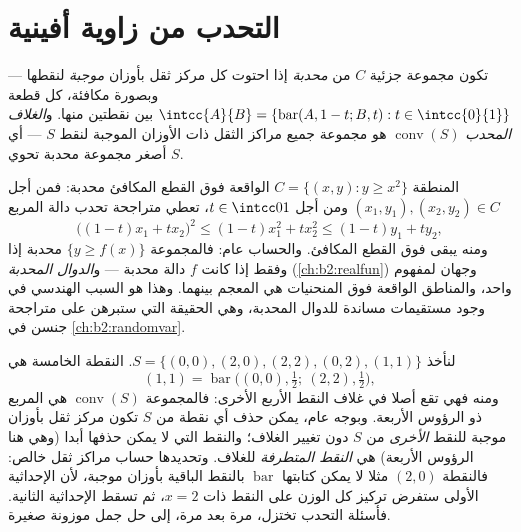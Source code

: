 \section{التحدب من زاوية أفينية}

\begin{definition}\label{def:b2:affine:convex}
تكون مجموعة جزئية $C$ من  \emph{محدبة}
إذا احتوت كل مركز ثقل بأوزان \emph{موجبة} لنقطها --- وبصورة مكافئة،
كل قطعة $\intcc{A}{B} = \{\operatorname{bar}(A,
1-t; B, t) : t \in \intcc{0}{1}\}$ بين نقطتين منها. و\emph{الغلاف المحدب}
$\operatorname{conv}(S)$ هو مجموعة جميع مراكز الثقل ذات الأوزان الموجبة لنقط $S$
--- أي أصغر مجموعة محدبة تحوي $S$.
\end{definition}

\begin{example}\label{ex:b2:affine:epigraph}
المنطقة $C = \{(x, y) : y \geq x^2\}$ الواقعة فوق القطع المكافئ محدبة: فمن أجل $(x_1, y_1), (x_2, y_2) \in C$ ومن
أجل $t \in
\intcc01$، تعطي متراجحة تحدب دالة المربع
\[
\bigl((1-t)x_1 + tx_2\bigr)^2 \leq (1-t)x_1^2 + tx_2^2
\leq (1-t)y_1 + ty_2 ,
\]
ومنه يبقى  فوق القطع المكافئ. والحساب عام: فالمجموعة
$\{y \geq f(x)\}$ محدبة إذا وفقط إذا كانت $f$ دالة محدبة --- \emph{}
و\emph{الدوال المحدبة} (\cref{ch:b2:realfun}) وجهان لمفهوم واحد، والمناطق
الواقعة فوق المنحنيات هي المعجم بينهما. وهذا هو السبب الهندسي في
وجود مستقيمات مساندة للدوال المحدبة، وهي الحقيقة التي ستبرهن على
متراجحة جنسن في \cref{ch:b2:randomvar}.
\end{example}

\begin{example}\label{ex:b2:affine:squarehull}
لنأخذ $S = \{(0,0), (2,0), (2,2), (0,2), (1,1)\}$. النقطة الخامسة هي 
\[
(1,1) = \operatorname{bar}\bigl((0,0), \tfrac12;\ (2,2),
\tfrac12\bigr),
\]
ومنه فهي تقع أصلا في غلاف النقط الأربع الأخرى: فالمجموعة $\operatorname{conv}(S)$ هي
المربع ذو الرؤوس الأربعة. وبوجه عام، يمكن حذف أي نقطة من $S$ تكون
مركز ثقل بأوزان موجبة للنقط \emph{الأخرى} من $S$ دون تغيير
الغلاف؛ والنقط التي لا يمكن حذفها أبدا (وهي هنا الرؤوس الأربعة) هي
\emph{النقط المتطرفة} للغلاف. وتحديدها حساب مراكز ثقل خالص: فالنقطة
$(2,0)$ مثلا لا يمكن كتابتها $\operatorname{bar}$ بالنقط الباقية بأوزان موجبة، لأن
الإحداثية الأولى ستفرض تركيز كل الوزن على النقط ذات $x = 2$، ثم تسقط
الإحداثية الثانية. فأسئلة التحدب تختزل، مرة بعد مرة، إلى حل جمل
موزونة صغيرة.
\end{example}

